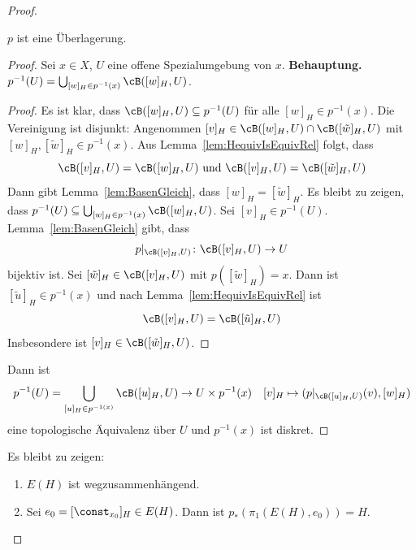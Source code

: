 \documentclass[language=ngerman]{TemplateLecture} %
\begin{document}
\begin{proof}
\begin{description}
\begin{description}
            \begin{prop}
                \(p\) ist eine Überlagerung.
            \end{prop}
            \begin{proof}
                Sei \(x \in X\), \(U\) eine offene Spezialumgebung von \(x\).
                \textbf{Behauptung.} \(p^{-1}(U) = \bigcup_{[w]_H \in p^{-1}(x)}\cB([w]_H, U)\).
                \begin{proof}
                    Es ist klar, dass \(\cB([w]_H, U) \subseteq p^{-1}(U)\) für alle \([w]_H \in p^{-1}(x)\).
                    Die Vereinigung ist disjunkt: Angenommen \([v]_H \in \cB([w]_H, U) \cap \cB([\tilde w]_H, U)\) mit \([w]_H, [\tilde w]_H \in p^{-1}(x)\). Aus Lemma~\ref{lem:HequivIsEquivRel} folgt, dass
                    \[\cB([v]_H, U) = \cB([w]_H, U) \text{ und } \cB([v]_H, U) = \cB([\tilde w]_H, U)\]
                    Dann gibt Lemma~\ref{lem:BasenGleich}, dass \([w]_H = [\tilde w]_H\).
                    Es bleibt zu zeigen, dass \(p^{-1}(U) \subseteq \bigcup_{[w]_H \in p^{-1}(x)} \cB([w]_H, U)\). Sei \([v]_H \in p^{-1}(U)\).
                    Lemma~\ref{lem:BasenGleich} gibt, dass
                    \[p\rvert_{\cB([v]_H,U)} \colon \cB([v]_H, U) \to U\]
                    bijektiv ist. Sei \([\tilde w]_H \in \cB([v]_H, U)\) mit \(p([\tilde w]_H) = x\). Dann ist \([\tilde u]_H \in p^{-1}(x)\) und nach Lemma~\ref{lem:HequivIsEquivRel} ist
                    \[\cB([v]_H, U) = \cB([\tilde u]_H, U)\]
                    Insbesondere ist \([v]_H \in \cB([\tilde w]_H, U)\).
                \end{proof}

                Dann ist
                \[p^{-1}(U) = \bigcup_{[u]_H \in p^{-1(x)}} \cB([u]_H, U) \to U \times p^{-1}(x) \quad [v]_H \mapsto (p\rvert_{\cB([u]_H, U)}(v), [w]_H)\]
                eine topologische Äquivalenz über \(U\) und \(p^{-1}(x)\) ist diskret.
            \end{proof}

            Es bleibt zu zeigen:
            \begin{enumerate}
                \item \(E(H)\) ist wegzusammenhängend.
                \item Sei \(e_0 = [\const_{x_0}]_H \in E(H)\). Dann ist \(p_*(\pi_1(E(H), e_0)) = H\).
            \end{enumerate}


\end{description}
\end{description}
\end{proof}
\end{document}
